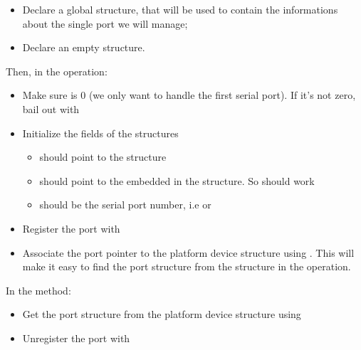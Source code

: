 \begin{itemize}
\item Declare a global  structure, that will be used
  to contain the informations about the single port we will manage;
\item Declare an empty  structure.
\end{itemize}

Then, in the  operation:

\begin{itemize}

\item Make sure  is 0 (we only want to handle the first
  serial port). If it's not zero, bail out with 

\item Initialize the fields of the  structures

  \begin{itemize}

  \item {} should point to the  structure

  \item {} should point to the  embedded
    in the  structure. So 
    should work

  \item {} should be the serial port number, i.e  or

  \end{itemize}

\item Register the port with 

\item Associate the port pointer to the platform device structure
  using . This will make it easy to find
  the port structure from the  structure in the
   operation.

\end{itemize}

In the  method:

\begin{itemize}

\item Get the port structure from the platform device structure using

\item Unregister the port with 

\end{itemize}

